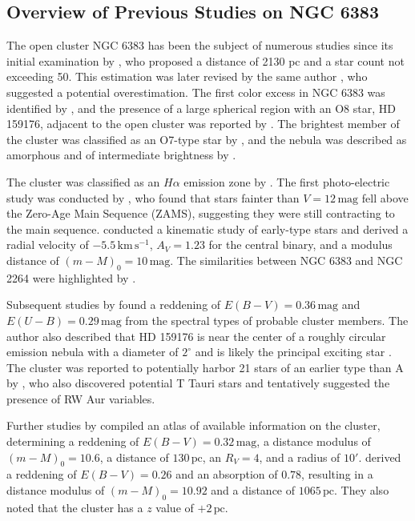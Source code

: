 \documentclass[fleqn,usenatbib,usedcolumn,useAMS]{mnras}
\newcommand{\kms}{\,\textrm{km}\,\textrm{s}^{-1}} %
\begin{document}
\subsection{Overview of Previous Studies on NGC 6383}\label{literature}

The open cluster NGC 6383 has been the subject of numerous studies since its initial examination by \citet{1930LicOB..14..154T}, who proposed a distance of 2130 pc and a star count not exceeding 50. This estimation was later revised by the same author \citep{1930PASP...42..342T}, who suggested a potential overestimation. The first color excess in NGC 6383 was identified by \citet{1937LicOB..18...89Z}, and the presence of a large spherical region with an O8 star, HD 159176, adjacent to the open cluster was reported by \citet{bok_bester_wade_1953}. The brightest member of the cluster was classified as an O7-type star by \citet{1954CoBAO..12....3M}, and the nebula was described as amorphous and of intermediate brightness by \citet{1959ApJS....4..257S}.

The cluster was classified as an $H\alpha$ emission zone by \citet{1960MNRAS.121..103R}. The first photo-electric study was conducted by \citet{1961RGOB...27...61E}, who found that stars fainter than $V = 12\,\textrm{mag}$ fell above the Zero-Age Main Sequence (ZAMS), suggesting they were still contracting to the main sequence. \citet{1962AJ.....67..491R} conducted a kinematic study of early-type stars and derived a radial velocity of $-5.5 \kms$, $A_V = 1.23$ for the central binary, and a modulus distance of $(m - M)_0 = 10 \,\textrm{mag}$. The similarities between NGC 6383 and NGC 2264 were highlighted by \citet{1965CoBos..32....0T}.

Subsequent studies by \citet{1968PhDT........29E} found a reddening of $E(B-V) = 0.36\,\textrm{mag}$ and $E(U-B) = 0.29\,\textrm{mag}$ from the spectral types of probable cluster members. The author also described that HD 159176 is near the center of a roughly circular emission nebula with a diameter of $2^\circ$ and is likely the principal exciting star \citep{1959ApJS....4..257S}. The cluster was reported to potentially harbor 21 stars of an earlier type than A by \citet{1966CoBos..34....1T}, who also discovered potential T Tauri stars and tentatively suggested the presence of RW Aur variables.

Further studies by \citet{1970PDDO....4....1H} compiled an atlas of available information on the cluster, determining a reddening of $E(B-V) = 0.32\,\textrm{mag}$, a distance modulus of $(m-M)_0 = 10.6$, a distance of $130\,\textrm{pc}$, an $R_V = 4$, and a radius of $10'$. \citet{1971AAS....4..241B} derived a reddening of $E(B-V) = 0.26$ and an absorption of $0.78$, resulting in a distance modulus of $(m-M)_0 = 10.92$ and a distance of $1065\,\textrm{pc}$. They also noted that the cluster has a $z$ value of $+2\,\textrm{pc}$.
\end{document}
